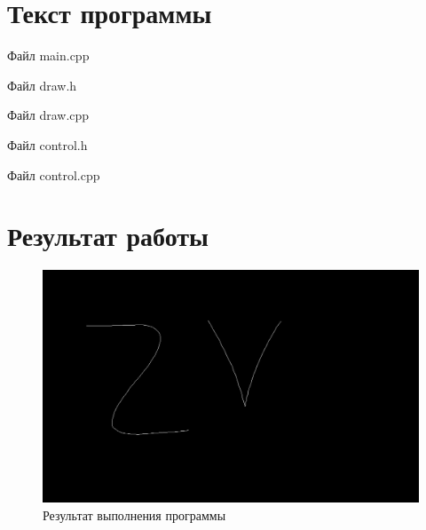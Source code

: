 \documentclass[14pt, a4paper]{extreport}
\begin{document}
\chapter{Текст программы}

\noindent Файл main.cpp

\pagebreak
\hrulefill

\noindent Файл draw.h

\hrulefill

\noindent Файл draw.cpp

\hrulefill

\noindent Файл control.h

\hrulefill

\noindent Файл control.cpp


\chapter{Результат работы}

\begin{figure}[h!]
	\centering
	\includegraphics[width = 12cm]{image/output}
  \caption{Результат выполнения программы}
\end{figure}


\end{document}
